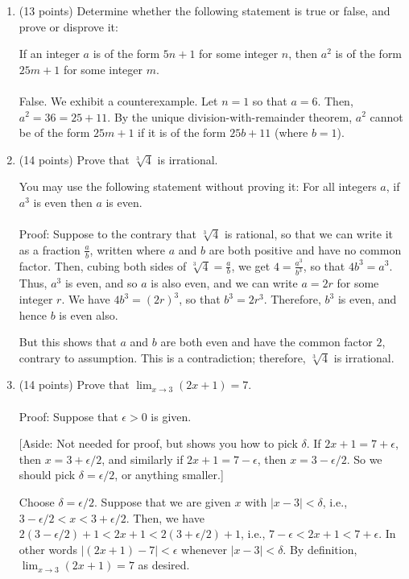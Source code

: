 \documentclass[12pt]{article}
\begin{document}
\begin{enumerate}[1.]
\item (13 points)
Determine whether the following statement is true or false, and prove or disprove it:

If an integer $a$ is of the form $5n + 1$ for some integer $n$, then $a^2$ is of the form $25m + 1$ for some integer $m$.
\\
\\
False. We exhibit a counterexample. Let $n = 1$ so that $a = 6$. Then, $a^2 = 36 = 25 + 11$. By the unique division-with-remainder
theorem, $a^2$ cannot be of the form $25 m + 1$ if it is of the form $25 b + 11$ (where $b = 1$). 

\item (14 points)
Prove that  $\sqrt[3]{4}$ is irrational.

You may use the following statement without proving it: For all integers $a$, if $a^3$ is even then $a$ is even.
\\
\\
Proof: Suppose to the contrary that $\sqrt[3]{4}$ is rational, so that we can write it as a fraction $\frac{a}{b}$, written
where $a$ and $b$ are both positive and have no common factor. Then, cubing both sides of $\sqrt[3]{4} = \frac{a}{b}$,
we get $4 = \frac{a^3}{b^3}$, so that $4 b^3 = a^3$. Thus, $a^3$ is even, and so $a$ is also even, and we can write $a = 2r$ for some 
integer $r$. We have $4 b^3 = (2r)^3$, so that $b^3 = 2r^3$. Therefore, $b^3$ is even, and hence $b$ is even also. 

But this shows that $a$ and $b$ are both even and have the common factor $2$, contrary to assumption. This is a contradiction;
therefore, $\sqrt[3]{4}$ is irrational.

\item (14 points)
Prove that $\lim_{x \rightarrow 3} (2x + 1) = 7.$
\\
\\
Proof: Suppose that $\epsilon > 0$ is given.

[Aside: Not needed for proof, but shows you how to pick $\delta$. If $2x + 1 = 7 + \epsilon$, then $x = 3 + \epsilon/2$, and similarly
if $2x + 1 = 7 - \epsilon$, then $x = 3 - \epsilon/2$. So we should pick $\delta = \epsilon/2$, or anything smaller.]

Choose $\delta = \epsilon/2$. Suppose that we are given $x$ with $|x - 3| < \delta$, i.e., $3 - \epsilon/2 < x < 3 + \epsilon/2$.
Then, we have $2(3 - \epsilon/2) + 1 < 2x + 1 < 2(3 + \epsilon/2) + 1$, i.e., $7 - \epsilon < 2x + 1 < 7 + \epsilon$. In other words
$|(2x + 1) - 7| < \epsilon$ whenever $|x - 3| < \delta$. By definition, $\lim_{x \rightarrow 3} (2x + 1) = 7$ as desired.


\end{enumerate}
\end{document}
